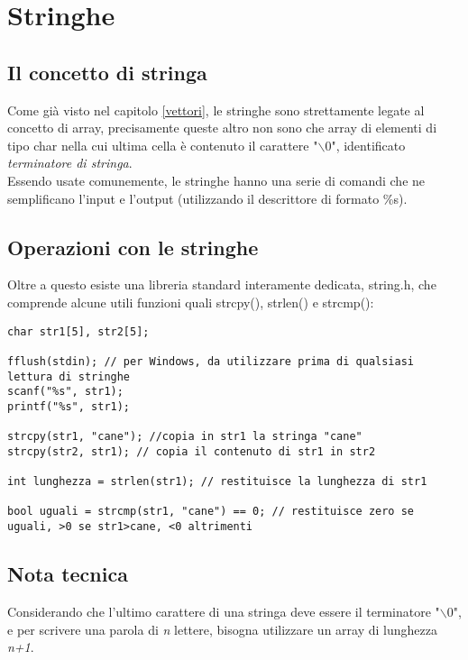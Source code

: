 \chapter{Stringhe}

\section{Il concetto di stringa}
Come già visto nel capitolo \ref{vettori}, le stringhe sono strettamente legate al concetto di array, precisamente queste altro non sono che array di elementi di tipo char nella cui ultima cella è contenuto il carattere "$\backslash0$", identificato \textit{terminatore di stringa}.\\
Essendo usate comunemente, le stringhe hanno una serie di comandi che ne semplificano l'input e l'output (utilizzando il descrittore di formato \colorbox{light-gray}{\%s}).

\section{Operazioni con le stringhe}
Oltre a questo esiste una libreria standard interamente dedicata, \colorbox{light-gray}{string.h}, che comprende alcune utili funzioni quali \colorbox{light-gray}{strcpy()}, \colorbox{light-gray}{strlen()} e \colorbox{light-gray}{strcmp()}:
\begin{lstlisting}[title={Alcune operazione con le stringhe}]
char str1[5], str2[5];

fflush(stdin); // per Windows, da utilizzare prima di qualsiasi lettura di stringhe
scanf("%s", str1);
printf("%s", str1);

strcpy(str1, "cane"); //copia in str1 la stringa "cane"
strcpy(str2, str1); // copia il contenuto di str1 in str2

int lunghezza = strlen(str1); // restituisce la lunghezza di str1

bool uguali = strcmp(str1, "cane") == 0; // restituisce zero se uguali, >0 se str1>cane, <0 altrimenti
\end{lstlisting}
\section{Nota tecnica}
Considerando che l'ultimo carattere di una stringa deve essere il terminatore "$\backslash0$", e per scrivere una parola di \textit{n} lettere, bisogna utilizzare un array di lunghezza \textit{n+1}.
